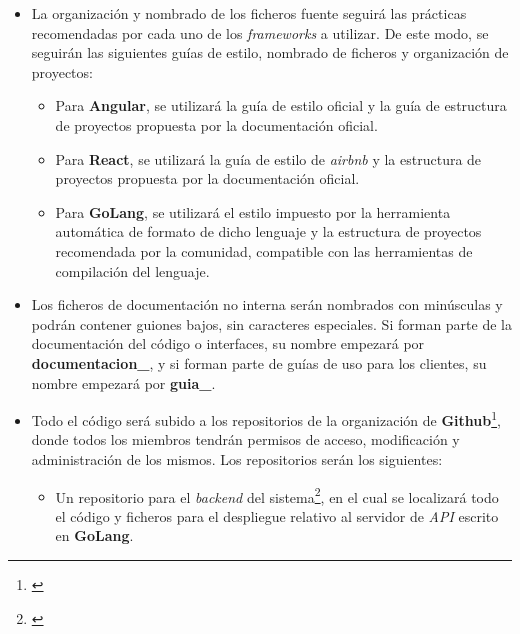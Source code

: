 \documentclass[11pt, a4paper, titlepage]{article}
\begin{document}
\begin{itemize}
    \item La organización y nombrado de los ficheros fuente seguirá las prácticas recomendadas por cada uno de los \textit{frameworks} a utilizar. De este modo, se seguirán las siguientes guías de estilo, nombrado de ficheros y organización de proyectos:
    \begin{itemize}
        \item Para \textbf{Angular}, se utilizará la guía de estilo oficial\textsuperscript{\cite{estiloangular}} y la guía de estructura de proyectos propuesta por la documentación oficial\textsuperscript{\cite{estructuraangular}}.
        
        \item Para \textbf{React}, se utilizará la
        guía de estilo de \textit{airbnb}\textsuperscript{\cite{estiloreact}} y la estructura de proyectos propuesta por la documentación oficial\textsuperscript{\cite{estructurareact}}.
        
        \item Para \textbf{GoLang}, se utilizará el estilo impuesto por la herramienta automática de formato de dicho lenguaje\textsuperscript{\cite{estilogolang}} y la estructura de proyectos recomendada por la comunidad\textsuperscript{\cite{estructuragolang}}, compatible con las herramientas de compilación del lenguaje.
    \end{itemize}
    
    \item Los ficheros de documentación no interna serán nombrados con minúsculas y podrán contener guiones bajos, sin caracteres especiales. Si forman parte de la documentación del código o interfaces, su nombre empezará por \textbf{documentacion\_}, y si forman parte de guías de uso para los clientes, su nombre empezará por \textbf{guia\_}.
    
    \item Todo el código será subido a los repositorios de la organización de \textbf{Github}\footnote{\href{https://github.com/UNIZAR-30226-2022-01}{}}, donde todos los miembros tendrán permisos de acceso, modificación y administración de los mismos. Los repositorios serán los siguientes:
    \begin{itemize}
        \item Un repositorio para el \textit{backend} del sistema\footnote{\href{https://github.com/UNIZAR-30226-2022-01/proyecto_software_backend}{}}, en el cual se localizará todo el código y ficheros para el despliegue relativo al servidor de \textit{API} escrito en \textbf{GoLang}.
        

\end{itemize}
\end{itemize}
\end{document}
